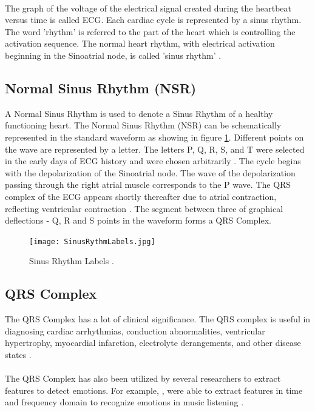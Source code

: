 \paragraph{}
The graph of the voltage of the electrical signal created during the heartbeat versus time is called ECG. Each cardiac cycle is represented by a sinus rhythm. The word 'rhythm' is referred to the part of the heart which is controlling the activation sequence. The normal heart rhythm, with electrical activation beginning in the Sinoatrial node, is called 'sinus rhythm' \cite{hampton_ecg_2013}.

\subsection{Normal Sinus Rhythm (NSR)}
A Normal Sinus Rhythm is used to denote a Sinus Rhythm of a healthy functioning heart. The Normal Sinus Rhythm (NSR) can be schematically represented in the standard waveform as showing in figure \ref{fig:sinus_rhythm_labels}. Different points on the wave are represented by a letter. The letters P, Q, R, S, and T were selected in the early days of ECG history and were chosen arbitrarily \cite{hampton_ecg_2013}. The cycle begins with the depolarization of the Sinoatrial node. The wave of the depolarization passing through the right atrial muscle corresponds to the P wave. The QRS complex of the ECG appears shortly thereafter due to atrial contraction, reflecting ventricular contraction \cite{cacioppo_cardiovascular_2016_p_183_216}. The segment between three of graphical deflections - Q, R and S points in the waveform forms a QRS Complex.

\begin{figure}
    \centering
    \texttt{[image: SinusRythmLabels.jpg]}
    \caption{Sinus Rhythm Labels \cite{cacioppo_cardiovascular_2016_p_183_216}.}
    \label{fig:sinus_rhythm_labels}
\end{figure}

\subsection{QRS Complex}
The QRS Complex has a lot of clinical significance. The QRS complex is useful in diagnosing cardiac arrhythmias, conduction abnormalities, ventricular hypertrophy, myocardial infarction, electrolyte derangements, and other disease states \cite{noauthor_qrs_2018}.
\paragraph{}
The QRS Complex has also been utilized by several researchers to extract features to detect emotions. For example, \citeauthor{kim_emotion_2004}, were able to extract features in time and frequency domain to recognize emotions in music listening \cite{kim_emotion_2004}.

